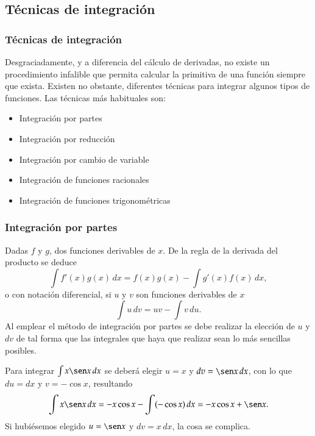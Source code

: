 \subsection{Técnicas de integración}
\begin{frame}
	\frametitle{Técnicas de integración}
	Desgraciadamente, y a diferencia del cálculo de derivadas, no existe un procedimiento infalible que permita calcular la primitiva de una función siempre que exista. Existen no obstante, diferentes técnicas para integrar algunos tipos de funciones. Las técnicas más habituales son:
	\begin{itemize}
		\item Integración por partes
		\item Integración por reducción
		\item Integración por cambio de variable
		\item Integración de funciones racionales
		\item Integración de funciones trigonométricas
	\end{itemize}
\end{frame}


\begin{frame}
	\frametitle{Integración por partes}
	Dadas $f$ y $g$, dos funciones derivables de $x$. De la regla de la derivada del producto se deduce
	\[
		\int{f'(x)g(x)}\,dx=f(x)g(x)-\int{g'(x)f(x)}\,dx,
	\]
	o con notación diferencial, si $u$ y $v$ son funciones derivables de $x$
	\[
		\int{u}\,dv=uv-\int{v}\,du.
	\]
	Al emplear el método de integración por partes se debe realizar la elección de $u$ y $dv$ de tal forma que las integrales que haya que realizar sean lo más sencillas posibles.
	
	 Para integrar $\int{x \sen x}\,dx$ se deberá elegir $u=x$ y $dv=\sen x\, dx$, con lo que $du=dx$ y $v=-\cos x$, resultando
	\[
		\int{x \sen x}\,dx=-x\cos x-\int (-\cos x)\,dx = -x\cos x +\sen x.
	\]
	Si hubiésemos elegido $u=\sen x$ y $dv=x\,dx$, la cosa se complica.
\end{frame}



